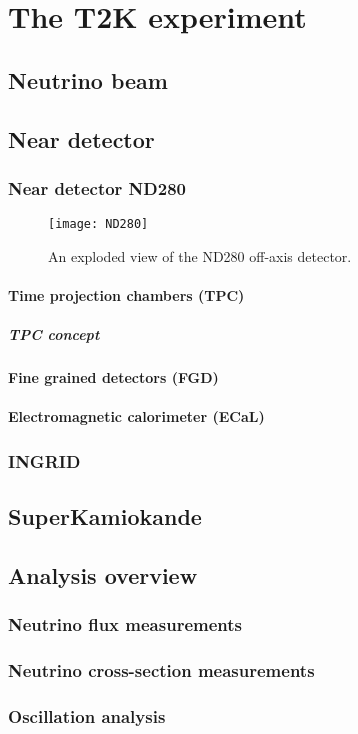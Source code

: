 \documentclass[../main.tex]{subfiles}
\begin{document}
\renewcommand{\labelitemi}{\ding{226}}
\renewcommand{\labelitemii}{\ding{227}}

\part{The T2K experiment}
\label{T2K:general}

\chapter{Neutrino beam}
\label{T2K:nu_beam}
\chapter{Near detector}
\label{T2K:nd}
\section{Near detector ND280}
\label{T2K:nd280}
\begin{figure}[h!]
    \begin{center}
    \texttt{[image: ND280]}
    \caption{An exploded view of the ND280 off-axis detector.}
    \label{T2K:fig:ND280}
    \end{center}
\end{figure}
\subsection{Time projection chambers (TPC)}
\subsubsection{TPC concept}
\subsection{Fine grained detectors (FGD)}
\subsection{Electromagnetic calorimeter (ECaL)}
\section {INGRID}
\chapter{SuperKamiokande}
\chapter{Analysis overview}
\section{Neutrino flux measurements}
\section{Neutrino cross-section measurements}
\section{Oscillation analysis}
\end{document}
